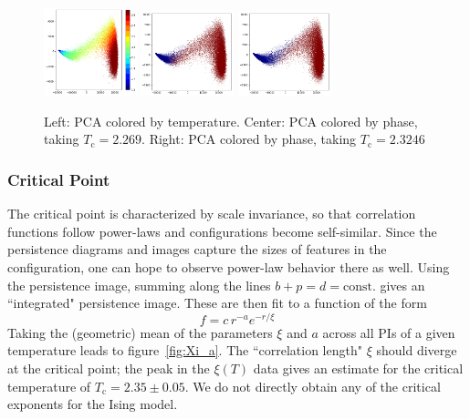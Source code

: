 \documentclass[11pt]{article}
\begin{document}
\begin{figure}[h]
    \centering
    \includegraphics[width=0.24\textwidth]{ising_images/pca_2d_ising}
    \includegraphics[width=0.24\textwidth]{ising_images/pca_phase_2d_ising}
    \includegraphics[width=0.24\textwidth]{ising_images/pca_phase2_2d_ising}
    \caption{Left: PCA colored by temperature. Center: PCA colored by phase, taking $T_\text{c}=2.269$. Right: PCA colored by phase, taking $T_\text{c}=2.3246$}
    \label{fig:IsingPCA}
\end{figure}


\subsubsection{Critical Point}
The critical point is characterized by scale invariance, so that correlation functions follow power-laws and configurations become self-similar. Since the persistence diagrams and images capture the sizes of features in the configuration, one can hope to observe power-law behavior there as well. Using the persistence image, summing along the lines $b+p=d=\text{const.}$ gives an ``integrated" persistence image. These are then fit to a function of the form
\begin{equation}
	f = c\,r^{-a}e^{-r/\xi}
\end{equation}
Taking the (geometric) mean of the parameters $\xi$ and $a$ across all PIs of a given temperature leads to figure~\ref{fig:Xi_a}. The ``correlation length" $\xi$ should diverge at the critical point; the peak in the $\xi(T)$ data gives an estimate for the critical temperature of $T_\text{c}=2.35\pm0.05$. We do not directly obtain any of the critical exponents for the Ising model.
\end{document}
